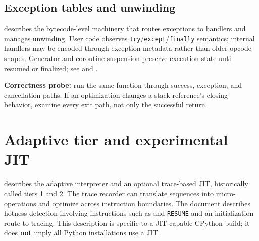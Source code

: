 \documentclass[
  11pt,
]{report}
\newcommand{\passthrough}[1]{#1}
\begin{document}
\section{Exception tables and
unwinding}\label{exception-tables-and-unwinding}

 describes
the bytecode-level machinery that routes exceptions to handlers and
manages unwinding. User code observes
\passthrough{\lstinline!try!}/\passthrough{\lstinline!except!}/\passthrough{\lstinline!finally!}
semantics; internal handlers may be encoded through exception metadata
rather than older opcode shapes. Generator and coroutine suspension
preserve execution state until resumed or finalized; see
 and
.

\textbf{Correctness probe:} run the same function through success,
exception, and cancellation paths. If an optimization changes a stack
reference's closing behavior, examine every exit path, not only the
successful return.

\chapter{Adaptive tier and experimental
JIT}\label{adaptive-tier-and-experimental-jit}

 describes the adaptive
interpreter and an optional trace-based JIT, historically called tiers 1
and 2. The trace recorder can translate sequences into micro-operations
and optimize across instruction boundaries. The document describes
hotness detection involving instructions such as
 and
\passthrough{\lstinline!RESUME!} and an initialization route to tracing.
This description is specific to a JIT-capable CPython build; it does
\textbf{not} imply all Python installations use a JIT.
\end{document}
